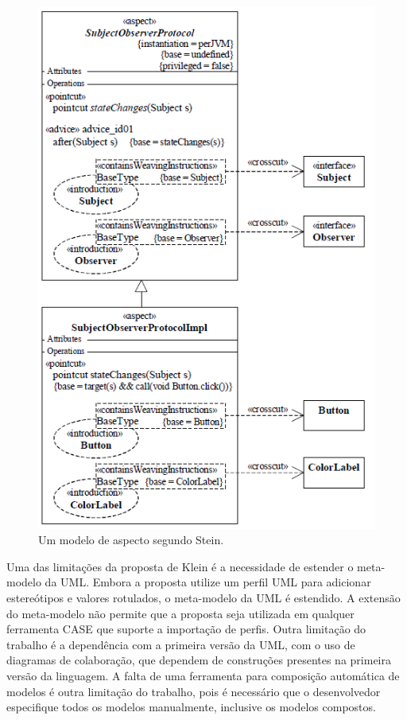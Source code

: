 \begin{figure}
	\centering
	\includegraphics{img/stein_1.png}
	\caption{Um modelo de aspecto segundo Stein.}\label{fig:stein_1}
\end{figure}

Uma das limitações da proposta de Klein é a necessidade de estender o meta-modelo da UML. Embora a proposta utilize um perfil UML para adicionar estereótipos e valores rotulados, o meta-modelo da
UML é estendido. A extensão do meta-modelo não permite que a proposta seja utilizada em qualquer ferramenta CASE que suporte a importação de perfis.
Outra limitação do trabalho é a dependência com a primeira versão da UML, com o uso de diagramas de colaboração, que dependem de construções presentes
na primeira versão da linguagem. A falta de uma ferramenta para composição automática de modelos é outra limitação do trabalho, pois é necessário que o desenvolvedor
especifique todos os modelos manualmente, inclusive os modelos compostos.

